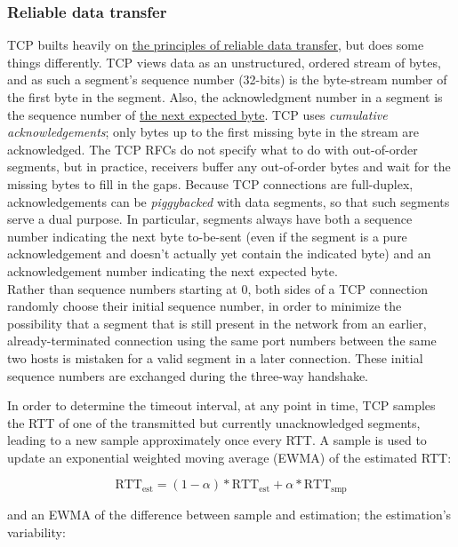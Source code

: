 \documentclass[8pt, table, xcdraw]{article}%
\begin{document}
\subsubsection{Reliable data transfer}

TCP builts heavily on \hyperref[reliabledatatransfer]{the principles of reliable data transfer}, but does some things differently. TCP views data as an unstructured, ordered stream of bytes, and as such a segment's sequence number (32-bits) is the byte-stream number of the first byte in the segment. Also, the acknowledgment number in a segment is the sequence number of \underline{the next expected byte}. TCP uses \emph{cumulative acknowledgements}; only  bytes up to the first missing byte in the stream are acknowledged. The TCP RFCs do not specify what to do with out-of-order segments, but in practice, receivers buffer any out-of-order bytes and wait for the missing bytes to fill in the gaps. Because TCP connections are full-duplex, acknowledgements can be \emph{piggybacked} with data segments, so that such segments serve a dual purpose. In particular, segments always have both a sequence number indicating the next byte to-be-sent (even if the segment is a pure acknowledgement and doesn't actually yet contain the indicated byte) and an acknowledgement number indicating the next expected byte.\\
Rather than sequence numbers starting at 0, both sides of a TCP connection randomly choose their initial sequence number, in order to minimize the possibility that a segment that is still present in the network from an earlier, already-terminated connection using the same port numbers between the same two hosts is mistaken for a valid segment in a later connection. These initial sequence numbers are exchanged during the three-way handshake.

In order to determine the timeout interval, at any point in time, TCP samples the RTT of one of the transmitted but currently unacknowledged segments, leading to a new sample approximately once every RTT. A sample is used to update an exponential weighted moving average (EWMA) of the estimated RTT:

\begin{equation}
    \text{RTT}_\text{est} = (1 - \alpha) * \text{RTT}_\text{est} + \alpha * \text{RTT}_\text{smp}
\end{equation}

and an EWMA of the difference between sample and estimation; the estimation's variability:
\end{document}

